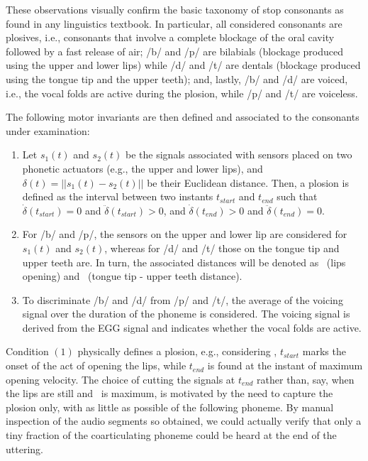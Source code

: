 These observations visually confirm the basic taxonomy of stop consonants 
as found in any linguistics textbook.
In particular, all considered consonants are plosives,
i.e., consonants that involve a complete blockage of the oral cavity followed by a fast release of air;
 /b/ and /p/ are bilabials (blockage produced using the upper and lower lips) while /d/ and /t/ are
dentals (blockage produced using the tongue tip and the upper teeth);
and, lastly, /b/ and /d/ are voiced, i.e., the vocal folds are active during
the plosion, while /p/ and /t/ are voiceless.

The following motor invariants are then defined and associated to the
consonants under examination:

\begin{enumerate}

  \item Let $s_1(t)$ and $s_2(t)$ be the signals associated
    with sensors placed on two phonetic actuators (e.g., the upper and
    lower lips), and $\delta(t) = ||s_1(t)-s_2(t)||$ be their
    Euclidean distance. Then, a plosion is defined as the interval
    between two instants $t_{start}$ and $t_{end}$ such that
    $\dot{\delta}(t_{start}) = 0 $ and $\ddot{\delta}(t_{start}) > 0$,
    and $\dot{\delta}(t_{end}) > 0 $ and $\ddot{\delta}(t_{end}) = 0$.

  \item For /b/ and /p/, the sensors on the upper and lower
    lip are considered for $s_1(t)$ and $s_2(t)$, whereas for /d/ and /t/
    those on the tongue tip and upper teeth are. In turn, the associated
    distances will be denoted as \lio\ (lips opening) and \ttu\
    (tongue tip - upper teeth distance).

  \item To discriminate /b/ and /d/ from /p/ and /t/, the average of the
    voicing signal over the duration of the phoneme is considered. The
    voicing signal is derived from the EGG signal and indicates
    whether the vocal folds are active.

\end{enumerate}

Condition $(1)$ physically defines a plosion, e.g., considering \lio, $t_{start}$
marks the onset of the act of opening the lips, while $t_{end}$ is found at the
instant of maximum opening velocity. The choice of cutting the signals at $t_{end}$
rather than, say, when the lips are still and \lio\ is maximum, is motivated by
the need to capture the plosion only, with as little as possible of the following
phoneme. By manual inspection of the audio segments so obtained, we could actually
verify that only a tiny fraction of the coarticulating phoneme could be heard
at the end of the uttering.

